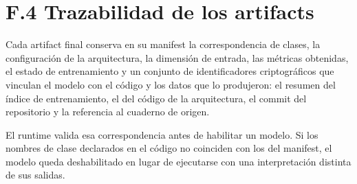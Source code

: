 \section*{F.4 Trazabilidad de los artifacts}
\label{anexo:entrenamiento-f4-trazabilidad-artifacts}

Cada artifact final conserva en su manifest la correspondencia de clases, la configuración de la arquitectura, la dimensión de entrada, las métricas obtenidas, el estado de entrenamiento y un conjunto de identificadores criptográficos que vinculan el modelo con el código y los datos que lo produjeron: el resumen del índice de entrenamiento, el del código de la arquitectura, el commit del repositorio y la referencia al cuaderno de origen.

El runtime valida esa correspondencia antes de habilitar un modelo. Si los nombres de clase declarados en el código no coinciden con los del manifest, el modelo queda deshabilitado en lugar de ejecutarse con una interpretación distinta de sus salidas.
